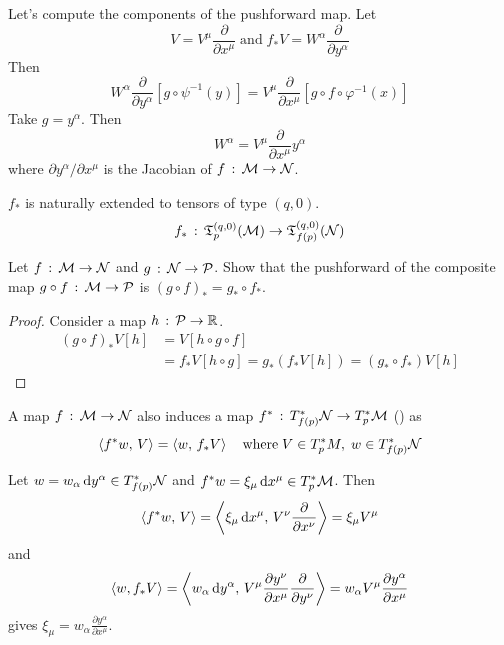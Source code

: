 \documentclass[a4paper, 10pt]{article}
\begin{document}

\begin{remark}
    Let's compute the components of the pushforward map. Let
    \[ V = V^{\mu}\frac{\partial}{\partial x^{\mu}} \;\text{and}\; f_{\ast}V = W^{\alpha}\frac{\partial}{\partial y^{\alpha}} \]
    Then
    \[ W^{\alpha}\frac{\partial}{\partial y^{\alpha}}[g \circ \psi^{-1}(y)] = V^{\mu}\frac{\partial}{\partial x^{\mu}}[g\circ f\circ \varphi^{-1}(x)] \]
    Take $g = y^{\alpha}$. Then
    \[ W^{\alpha} = V^{\mu}\frac{\partial}{\partial x^{\mu}} y^{\alpha} \]
    where $\partial{y}^{\alpha}/\partial{x}^{\mu}$ is the Jacobian of $f\,:\,\mathcal{M}\rightarrow\mathcal{N}$.
\end{remark}
\begin{remark}
    $f_{\ast}$ is naturally extended to tensors of type $(q,0)$.
    \[ f_{\ast} \,:\, \mathfrak{T}^{(q,0)}_{p}(\mathcal{M}) \rightarrow \mathfrak{T}^{(q,0)}_{f(p)}(\mathcal{N}) \]
\end{remark}

\begin{exer}
    Let $f\,:\,\mathcal{M}\rightarrow\mathcal{N}$ and $g\,:\,\mathcal{N}\rightarrow\mathcal{P}$. Show that the pushforward of the composite map $g\circ f\,:\, \mathcal{M}\rightarrow\mathcal{P}$ is $(g\circ f)_{\ast} = g_{\ast} \circ f_{\ast}$.
\end{exer}
\begin{proof}
    Consider a map $h \,:\, \mathcal{P} \rightarrow \mathbb{R}$.
    \begin{align*}
        (g \circ f)_{\ast}V[h] &= V[h \circ g \circ f] \\
        &= f_{\ast}V[h \circ g] = g_{\ast}(f_{\ast}V[h]) = (g_{\ast} \circ f_{\ast})V[h]
    \end{align*}
\end{proof}

\seprule

\begin{definition}[Pullback]
    A map $f \,:\, \mathcal{M} \rightarrow \mathcal{N}$ also induces a map $f^{\ast} \,:\, T_{f(p)}^{\ast}\mathcal{N} \rightarrow T_{p}^{\ast}\mathcal{M}$ () as
    \[ \left< f^{\ast}w,\, V\right> = \left< w,\, f_{\ast}V\right> \quad \text{where} \; V \in T_{p}^{\ast}{M},\; w \in T_{f(p)}^{\ast}\mathcal{N} \]
\end{definition}

\begin{remark}
    Let $w = w_{\alpha}\,\mathrm{d}{y}^{\alpha} \in T_{f(p)}^{\ast}\mathcal{N}$ and $f^{\ast}w = \xi_{\mu}\,\mathrm{d}{x}^{\mu} \in T_{p}^{\ast}\mathcal{M}$. Then
    \[ \left<f^{\ast}w,\, V\right> = \left<\xi_{\mu}\,\mathrm{d}{x}^{\mu},\,V^{\nu}\frac{\partial}{\partial x^{\nu}}\right> = \xi_{\mu}V^{\mu} \]
    and
    \[ \left<w,f_{\ast}V\right> = \left<w_{\alpha}\,\mathrm{d}{y}^{\alpha},\,V^{\mu}\frac{\partial{y}^{\nu}}{\partial{x}^{\mu}}\frac{\partial}{\partial{y}^{\nu}}\right> = w_{\alpha}V^{\mu}\frac{\partial{y}^{\alpha}}{\partial{x}^{\mu}} \]
    gives $\displaystyle{\xi_{\mu} = w_{\alpha}\frac{\partial{y}^{\alpha}}{\partial{x}^{\mu}}}$.
\end{remark}
\end{document}
